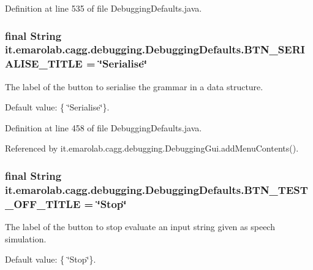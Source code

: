 Definition at line 535 of file Debugging\-Defaults.\-java.

\hypertarget{classit_1_1emarolab_1_1cagg_1_1debugging_1_1DebuggingDefaults_abed09e3aa400434e0b6c7988f6262e5a}{
\subsubsection[{B\-T\-N\-\_\-\-S\-E\-R\-I\-A\-L\-I\-S\-E\-\_\-\-T\-I\-T\-L\-E}]{\setlength{\rightskip}{0pt plus 5cm}final String it.\-emarolab.\-cagg.\-debugging.\-Debugging\-Defaults.\-B\-T\-N\-\_\-\-S\-E\-R\-I\-A\-L\-I\-S\-E\-\_\-\-T\-I\-T\-L\-E = \char`\"{}Serialise\char`\"{}\hspace{0.3cm}{\ttfamily [static]}}}\label{classit_1_1emarolab_1_1cagg_1_1debugging_1_1DebuggingDefaults_abed09e3aa400434e0b6c7988f6262e5a}
The label of the button to serialise the grammar in a data structure. \par
 Default value\-: \{ \char`\"{}\-Serialise\char`\"{}\}. 

Definition at line 458 of file Debugging\-Defaults.\-java.



Referenced by it.\-emarolab.\-cagg.\-debugging.\-Debugging\-Gui.\-add\-Menu\-Contents().

\hypertarget{classit_1_1emarolab_1_1cagg_1_1debugging_1_1DebuggingDefaults_ab8c0d6fba4275f95516dd06a79a01a36}{
\subsubsection[{B\-T\-N\-\_\-\-T\-E\-S\-T\-\_\-\-O\-F\-F\-\_\-\-T\-I\-T\-L\-E}]{\setlength{\rightskip}{0pt plus 5cm}final String it.\-emarolab.\-cagg.\-debugging.\-Debugging\-Defaults.\-B\-T\-N\-\_\-\-T\-E\-S\-T\-\_\-\-O\-F\-F\-\_\-\-T\-I\-T\-L\-E = \char`\"{}Stop\char`\"{}\hspace{0.3cm}{\ttfamily [static]}}}\label{classit_1_1emarolab_1_1cagg_1_1debugging_1_1DebuggingDefaults_ab8c0d6fba4275f95516dd06a79a01a36}
The label of the button to stop evaluate an input string given as speech simulation. \par
 Default value\-: \{ \char`\"{}\-Stop\char`\"{}\}. 

